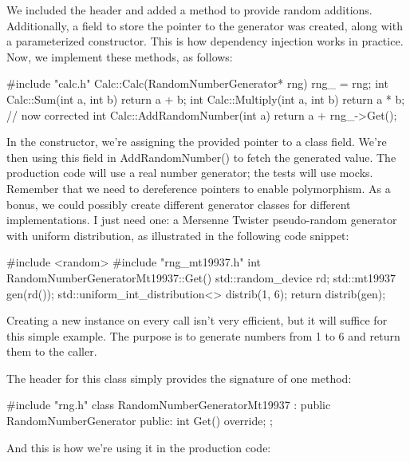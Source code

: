 We included the header and added a method to provide random additions. Additionally, a field to store the pointer to the generator was created, along with a parameterized constructor. This is how dependency injection works in practice. Now, we implement these methods, as follows:


\begin{cpp}
#include "calc.h"
Calc::Calc(RandomNumberGenerator* rng) {
    rng_ = rng;
}
int Calc::Sum(int a, int b) {
    return a + b;
}
int Calc::Multiply(int a, int b) {
    return a * b; // now corrected
}
int Calc::AddRandomNumber(int a) {
    return a + rng_->Get();
}
\end{cpp}

In the constructor, we’re assigning the provided pointer to a class field. We’re then using this field in AddRandomNumber() to fetch the generated value. The production code will use a real number generator; the tests will use mocks. Remember that we need to dereference pointers to enable polymorphism. As a bonus, we could possibly create different generator classes for different implementations. I just need one: a Mersenne Twister pseudo-random generator with uniform distribution, as illustrated in the following code snippet:


\begin{cpp}
#include <random>
#include "rng_mt19937.h"
int RandomNumberGeneratorMt19937::Get() {
    std::random_device rd;
    std::mt19937 gen(rd());
    std::uniform_int_distribution<> distrib(1, 6);
    return distrib(gen);
}
\end{cpp}

Creating a new instance on every call isn’t very efficient, but it will suffice for this simple example. The purpose is to generate numbers from 1 to 6 and return them to the caller.

The header for this class simply provides the signature of one method:


\begin{cpp}
#include "rng.h"
class RandomNumberGeneratorMt19937
    : public RandomNumberGenerator {
public:
    int Get() override;
};
\end{cpp}

And this is how we’re using it in the production code:


